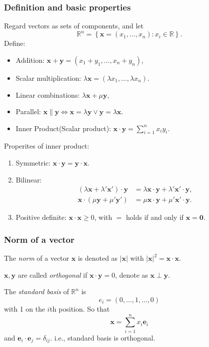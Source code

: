 \documentclass[a4paper]{article}
\begin{document}
\subsubsection{Definition and basic properties}
\begin{definition}
  Regard vectors as sets of components, and let
  \[
    \mathbb{R}^n = \left\{ \mathbf{x}=(x_1,\dots, x_n): x_i\in
    \mathbb{R} \right\}
  .\]
  Define:
  \begin{itemize}
    \item Addition: $ \mathbf{x}+\mathbf{y}=(x_1+y_1,\dots,x_n+y_n) $,
    \item Scalar multiplication: $ \lambda \mathbf{x}=(\lambda
      x_1,\dots,\lambda x_n) $.
    \item Linear combinations: $ \lambda \mathbf{x}+\mu \mathbf{y} $,
    \item Parallel: $ \mathbf{x} \parallel \mathbf{y} \Leftrightarrow
      \mathbf{x}=\lambda \mathbf{y} \lor \mathbf{y}=\lambda \mathbf{x} $.
    \item Inner Product(Scalar product): $ \mathbf{x}\cdot
      \mathbf{y}= \sum_{i=1}^{n} x_iy_i $.
  \end{itemize}
\end{definition}
Properites of inner product:
\begin{enumerate}[(1).]
  \item Symmetric: $ \mathbf{x}\cdot \mathbf{y}=\mathbf{y}\cdot \mathbf{x} $.
  \item Bilinear:
    \[
      \begin{aligned}
        (\lambda \mathbf{x}+\lambda' \mathbf{x}')\cdot
        \mathbf{y}&=\lambda \mathbf{x}\cdot \mathbf{y}+\lambda'
        \mathbf{x}'\cdot \mathbf{y},\\
        \mathbf{x}\cdot (\mu\mathbf{y}+\mu' \mathbf{y}')&=\mu
        \mathbf{x}\cdot \mathbf{y}+\mu' \mathbf{x}' \cdot \mathbf{y}.
      \end{aligned}
    \]
  \item Positive definite: $ \mathbf{x}\cdot \mathbf{x}\ge 0 $, with
    $=$ holds if and only if $ \mathbf{x}=\mathbf{0} $.
\end{enumerate}
\subsubsection{Norm of a vector}
\begin{definition}
  The \textit{norm} of a vector $ \mathbf{x} $ is denoted as $
  |\mathbf{x}| $ with $ |\mathbf{x}|^2=\mathbf{x}\cdot \mathbf{x} $.

  $ \mathbf{x},\mathbf{y} $ are called \textit{orthogonal} if $
  \mathbf{x}\cdot \mathbf{y}=0 $, denote as $ \mathbf{x} \perp \mathbf{y} $.
\end{definition}
The \textit{standard basis} of $ \mathbb{R}^n $ is
\[
  e_i = (0,\dots,1,\dots,0)
\]
with 1 on the $i$th position. So that
\[
  \mathbf{x}=\sum_{i=1}^{n}x_i \mathbf{e}_i
\]
and $ \mathbf{e}_i \cdot \mathbf{e}_j = \delta_{ij} $. i.e., standard
basis is orthogonal.
\end{document}
